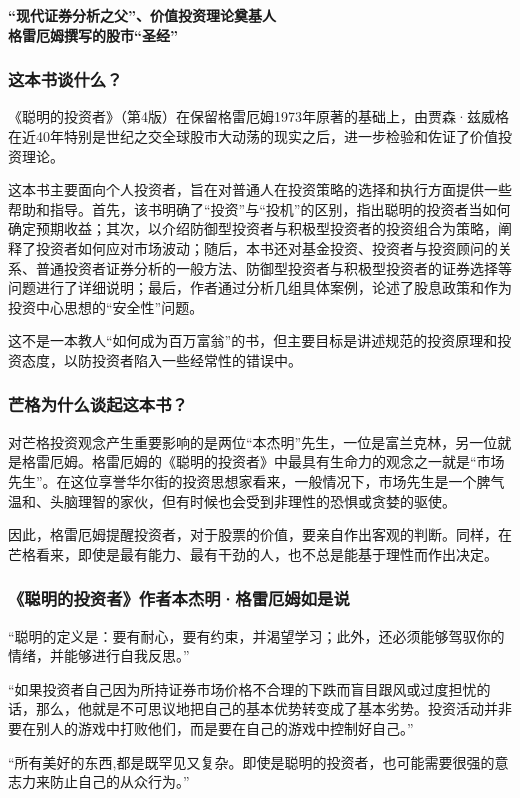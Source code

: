 \cleardoublepage
{}


\begin{BookSummaryBox}
{\centering \textbf{“现代证券分析之父”、价值投资理论奠基人\\ 格雷厄姆撰写的股市“圣经”}\par}
\end{BookSummaryBox}

\subsubsection*{这本书谈什么？}

《聪明的投资者》（第4版）在保留格雷厄姆1973年原著的基础上，由贾森·兹威格在近40年特别是世纪之交全球股市大动荡的现实之后，进一步检验和佐证了价值投资理论。
\par

这本书主要面向个人投资者，旨在对普通人在投资策略的选择和执行方面提供一些帮助和指导。首先，该书明确了“投资”与“投机”的区别，指出聪明的投资者当如何确定预期收益；其次，以介绍防御型投资者与积极型投资者的投资组合为策略，阐释了投资者如何应对市场波动；随后，本书还对基金投资、投资者与投资顾问的关系、普通投资者证券分析的一般方法、防御型投资者与积极型投资者的证券选择等问题进行了详细说明；最后，作者通过分析几组具体案例，论述了股息政策和作为投资中心思想的“安全性”问题。
\par

这不是一本教人“如何成为百万富翁”的书，但主要目标是讲述规范的投资原理和投资态度，以防投资者陷入一些经常性的错误中。
\par

\subsubsection*{芒格为什么谈起这本书？}

对芒格投资观念产生重要影响的是两位“本杰明”先生，一位是富兰克林，另一位就是格雷厄姆。格雷厄姆的《聪明的投资者》中最具有生命力的观念之一就是“市场先生”。在这位享誉华尔街的投资思想家看来，一般情况下，市场先生是一个脾气温和、头脑理智的家伙，但有时候也会受到非理性的恐惧或贪婪的驱使。
\par

因此，格雷厄姆提醒投资者，对于股票的价值，要亲自作出客观的判断。同样，在芒格看来，即使是最有能力、最有干劲的人，也不总是能基于理性而作出决定。
\par

\subsubsection*{《聪明的投资者》作者本杰明·格雷厄姆如是说}

“聪明的定义是：要有耐心，要有约束，并渴望学习；此外，还必须能够驾驭你的情绪，并能够进行自我反思。”
\par

“如果投资者自己因为所持证券市场价格不合理的下跌而盲目跟风或过度担忧的话，那么，他就是不可思议地把自己的基本优势转变成了基本劣势。投资活动并非要在别人的游戏中打败他们，而是要在自己的游戏中控制好自己。”
\par

“所有美好的东西,都是既罕见又复杂。即使是聪明的投资者，也可能需要很强的意志力来防止自己的从众行为。”
\par
